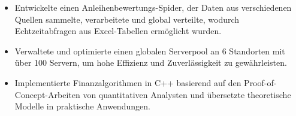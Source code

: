 \begin{minipage}{\linewidth}
\begin{itemize}
  \item Entwickelte einen Anleihenbewertungs-Spider, der Daten aus verschiedenen Quellen sammelte, verarbeitete und global verteilte, wodurch Echtzeitabfragen aus Excel-Tabellen ermöglicht wurden.
  \item Verwaltete und optimierte einen globalen Serverpool an 6 Standorten mit über 100 Servern, um hohe Effizienz und Zuverlässigkeit zu gewährleisten.
  \item Implementierte Finanzalgorithmen in C++ basierend auf den Proof-of-Concept-Arbeiten von quantitativen Analysten und übersetzte theoretische Modelle in praktische Anwendungen.
\end{itemize}
\end{minipage}
\divider
